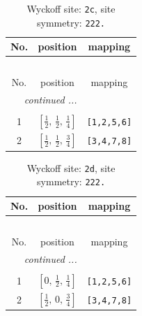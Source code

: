\documentclass[fleqn,8pt]{jsarticle}
\begin{document}
\renewcommand{\arraystretch}{1.2}
\begin{longtable}{ccc}
\caption{Wyckoff site: {\tt 2c}, site symmetry: {\tt 222.}}
 \\
 \hline \hline
No. & position & mapping \\ \hline \endfirsthead

\multicolumn{2}{l}{\tablename\ \thetable{}} \\
 \hline \hline
No. & position & mapping \\ \hline \endhead

 \hline \hline
\multicolumn{2}{r}{\footnotesize\it continued ...} \\ \endfoot

 \hline \hline
\multicolumn{2}{r}{} \\ \endlastfoot

1 & $\left[ \frac{1}{2},\, \frac{1}{2},\, \frac{1}{4} \right]$ & {\tt [1,2,5,6]} \\ \hline
2 & $\left[ \frac{1}{2},\, \frac{1}{2},\, \frac{3}{4} \right]$ & {\tt [3,4,7,8]} \\
\end{longtable}
\renewcommand{\arraystretch}{1.2}
\begin{longtable}{ccc}
\caption{Wyckoff site: {\tt 2d}, site symmetry: {\tt 222.}}
 \\
 \hline \hline
No. & position & mapping \\ \hline \endfirsthead

\multicolumn{2}{l}{\tablename\ \thetable{}} \\
 \hline \hline
No. & position & mapping \\ \hline \endhead

 \hline \hline
\multicolumn{2}{r}{\footnotesize\it continued ...} \\ \endfoot

 \hline \hline
\multicolumn{2}{r}{} \\ \endlastfoot

1 & $\left[ 0,\, \frac{1}{2},\, \frac{1}{4} \right]$ & {\tt [1,2,5,6]} \\ \hline
2 & $\left[ \frac{1}{2},\, 0,\, \frac{3}{4} \right]$ & {\tt [3,4,7,8]} \\
\end{longtable}
\renewcommand{\arraystretch}{1.2}
\end{document}
